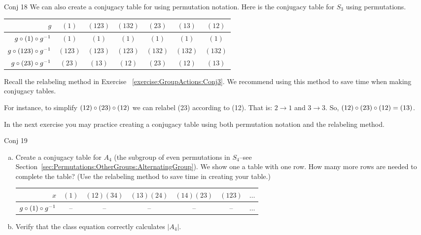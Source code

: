 \begin{example}{Conj 18}
We can also create a conjugacy table for using permutation notation. Here is the conjugacy table for $S_3$ using permutations.
  
\begin{center}
\begin{tabular}{|r | c | c |c | c | c |c |}\hline
$g$ &$(1)$ & $(123)$ &$(132)$ & $(23)$ & $(13)$ & $(12)$\\ \hline
$g\circ (1)\circ g^{-1}$ &$(1)$ & $(1)$ & $(1)$ &$(1)$ &$(1)$ & $(1)$ \\ \hline
$ g\circ (123)\circ g^{-1}$& $(123)$&$(123)$& $(123)$&$(132)$ &$(132)$ & $(132)$\\ \hline
$g\circ(23)\circ g^{-1}$ & $(23)$ &$(13)$ & $(12)$ & $(23)$ & $(12)$ & $(13)$\\ \hline 
\end{tabular}
\end{center}

Recall the relabeling method in Exercise  ~\ref{exercise:GroupActions:Conj3}.  We recommend using this method to save time when making conjugacy tables.  

For instance, to simplify $(12)\circ (23)\circ (12)$ we can relabel (23) according to (12).  That is: $2\rightarrow 1$ and $3\rightarrow 3$.  So,  $(12)\circ (23)\circ (12)=(13)$.
\end{example}

In the next exercise you may practice creating a conjugacy table using both permutation notation and the relabeling method.

\begin{exercise}{Conj 19}
\begin{enumerate}[(a)]
\item Create a conjugacy table for $A_4$ (the subgroup of even permutations in $S_4$--see Section~\ref{sec:Permutations:OtherGroups:AlternatingGroup}). We show one a table with one row.  How many more rows are needed to complete the  table? (Use the relabeling method to save time in creating your table.)

\begin{center}
\begin{tabular}
{|r |c| c| c| c| c|c}\hline
 $x$& $(1)$& $(12)(34)$&$(13)(24)$&$(14)(23)$&$(123)$&$\ldots$\\ \hline
$g \circ(1)\circ g^{-1}$ & -- & --& --&--&--& $\ldots$ \\ 
\end{tabular}
\end{center}

\item Verify that the class equation correctly calculates $|A_4|$.
\end {enumerate}
\end {exercise}


